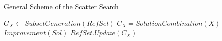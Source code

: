 \begin{algorithm}
  \caption{General Scheme of the Scatter Search} \label{alg:SSPhase}
  \begin{algorithmic}
    \Repeat
    \State $G_{X} \gets SubsetGeneration(RefSet)$
    \State $C_{X} = SolutionCombination(X)$
    \State $Improvement(Sol)$
    \EndFor
    \State $RefSet.Update(C_{X})$
    \EndIf \EndFor
    \EndProcedure
  \end{algorithmic}
\end{algorithm}
